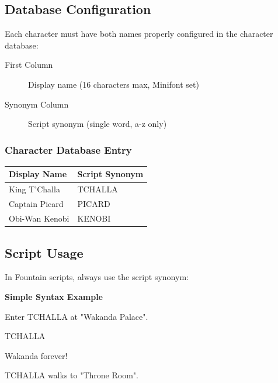 \documentclass[11pt,letterpaper,oldstylefigures]{memoir}
\newcommand{\speaker}[1]{\nobreak\hspace*{0.333\textwidth}\MakeUppercase{#1}\par\nobreak\vspace{0.5\baselineskip}}
\newcommand{\dialogue}[1]{\nobreak\hspace*{0.25\textwidth}\begin{minipage}{0.5\textwidth}#1\end{minipage}\par\vspace{1\baselineskip}}
\newcommand{\stagedir}[1]{#1\par\vspace{1\baselineskip}}
\newenvironment{FountainExample}
  {\begingroup
  \ttfamily\small
   \setlength{\parindent}{0pt}
  \setlength{\parskip}{0.5em}
  \allowdisplaybreaks
  \setlength{\displaywidowpenalty}{0}
  \setlength{\widowpenalty}{0}
  \setlength{\clubpenalty}{0}
  \setlength{\interlinepenalty}{0}
}
  {\endgroup}
\newenvironment{SimpleExample}
{\begingroup
\small
\setlength{\parindent}{0pt}
\setlength{\parskip}{0.5em}
\allowdisplaybreaks
\setlength{\displaywidowpenalty}{0}
\setlength{\widowpenalty}{0}
\setlength{\clubpenalty}{0}
\setlength{\interlinepenalty}{0}
\begin{tcolorbox}[
    colback=blue!5,
    colframe=blue!75!black,
    boxrule=0.5pt,
    arc=2pt,
    left=0.5em,
    right=0.5em,
    top=0.25em,
    bottom=0.25em
]
\textbf{Simple Syntax Example}
\end{tcolorbox}\par
}
{\endgroup}
\begin{document}
\subsection{Database Configuration}
Each character must have both names properly configured in the character database:
\begin{description}
\item[First Column] Display name (16 characters max, Minifont set)
\item[Synonym Column] Script synonym (single word, a-z only)
\end{description}

\subsubsection*{Character Database Entry}
\label{ex:character-database-entry}
\begin{center}
\begin{tabular}{|l|l|}
\hline
\textbf{Display Name} & \textbf{Script Synonym} \\
\hline
King T'Challa & TCHALLA \\
Captain Picard & PICARD \\
Obi-Wan Kenobi & KENOBI \\
\hline
\end{tabular}
\end{center}

\subsection{Script Usage}
In Fountain scripts, always use the script synonym:

\begin{SimpleExample}
\begin{FountainExample}
\stagedir{Enter TCHALLA at "Wakanda Palace".}
\speaker{TCHALLA}
\dialogue{Wakanda forever!}
\stagedir{TCHALLA walks to "Throne Room".}
\end{FountainExample}
\end{SimpleExample}
\end{document}
